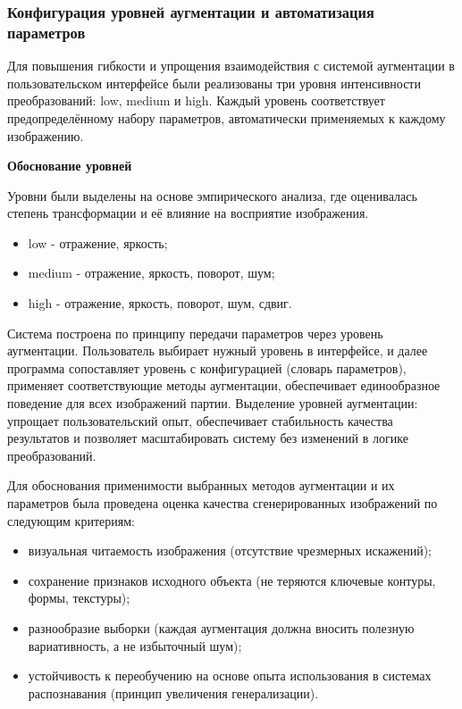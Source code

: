 
\subsubsection{Конфигурация уровней аугментации и автоматизация параметров}

Для повышения гибкости и упрощения взаимодействия с системой аугментации в пользовательском интерфейсе были реализованы три уровня интенсивности преобразований: low, medium и high. Каждый уровень соответствует предопределённому набору параметров, автоматически применяемых к каждому изображению.

\textbf{Обоснование уровней}

Уровни были выделены на основе эмпирического анализа, где оценивалась степень трансформации и её влияние на восприятие изображения. %
\begin{itemize}
	\item low - отражение, яркость;
	\item medium - отражение, яркость, поворот, шум;
	\item high - отражение, яркость, поворот, шум, сдвиг.
\end{itemize}
	

Система построена по принципу передачи параметров через уровень аугментации. Пользователь выбирает нужный уровень в интерфейсе, и далее программа сопоставляет уровень с конфигурацией (словарь параметров), применяет соответствующие методы аугментации, обеспечивает единообразное поведение для всех изображений партии. Выделение уровней аугментации: упрощает пользовательский опыт, обеспечивает стабильность качества результатов и позволяет масштабировать систему без изменений в логике преобразований.

Для обоснования применимости выбранных методов аугментации и их параметров была проведена оценка качества сгенерированных изображений по следующим критериям:
\begin{itemize}
	\item визуальная читаемость изображения (отсутствие чрезмерных искажений);
	\item сохранение признаков исходного объекта (не теряются ключевые контуры, формы, текстуры);
	\item разнообразие выборки (каждая аугментация должна вносить полезную вариативность, а не избыточный шум);
	\item устойчивость к переобучению на основе опыта использования в системах распознавания (принцип увеличения генерализации).
\end{itemize}

